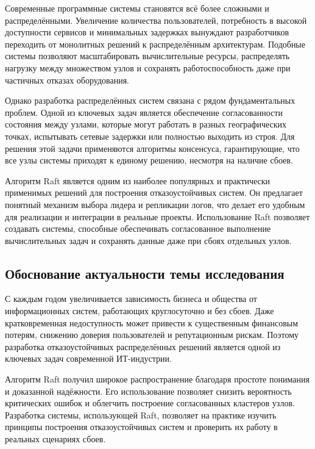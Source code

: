 \introduction %

Современные программные системы становятся всё более сложными и
распределёнными. Увеличение количества пользователей, потребность в высокой
доступности сервисов и минимальных задержках вынуждают разработчиков переходить
от монолитных решений к распределённым архитектурам. Подобные системы позволяют
масштабировать вычислительные ресурсы, распределять нагрузку между множеством
узлов и сохранять работоспособность даже при частичных отказах оборудования.

Однако разработка распределённых систем связана с рядом фундаментальных
проблем. Одной из ключевых задач является обеспечение согласованности состояния
между узлами, которые могут работать в разных географических точках, испытывать
сетевые задержки или полностью выходить из строя. Для решения этой задачи
применяются алгоритмы консенсуса, гарантирующие, что все узлы системы приходят
к единому решению, несмотря на наличие сбоев.

Алгоритм Raft является одним из наиболее популярных и практически применимых
решений для построения отказоустойчивых систем. Он предлагает понятный механизм
выбора лидера и репликации логов, что делает его удобным для реализации и
интеграции в реальные проекты. Использование Raft позволяет создавать системы,
способные обеспечивать согласованное выполнение вычислительных задач и
сохранять данные даже при сбоях отдельных узлов.

\subsection*{Обоснование актуальности темы исследования}

С каждым годом увеличивается зависимость бизнеса и общества от информационных
систем, работающих круглосуточно и без сбоев. Даже кратковременная
недоступность может привести к существенным финансовым потерям, снижению
доверия пользователей и репутационным рискам. Поэтому разработка
отказоустойчивых распределённых решений является одной из ключевых задач
современной ИТ-индустрии.

Алгоритм Raft получил широкое распространение благодаря простоте понимания и
доказанной надёжности. Его использование позволяет снизить вероятность
критических ошибок и облегчить построение согласованных кластеров узлов.
Разработка системы, использующей Raft, позволяет на практике изучить принципы
построения отказоустойчивых систем и проверить их работу в реальных сценариях
сбоев.

